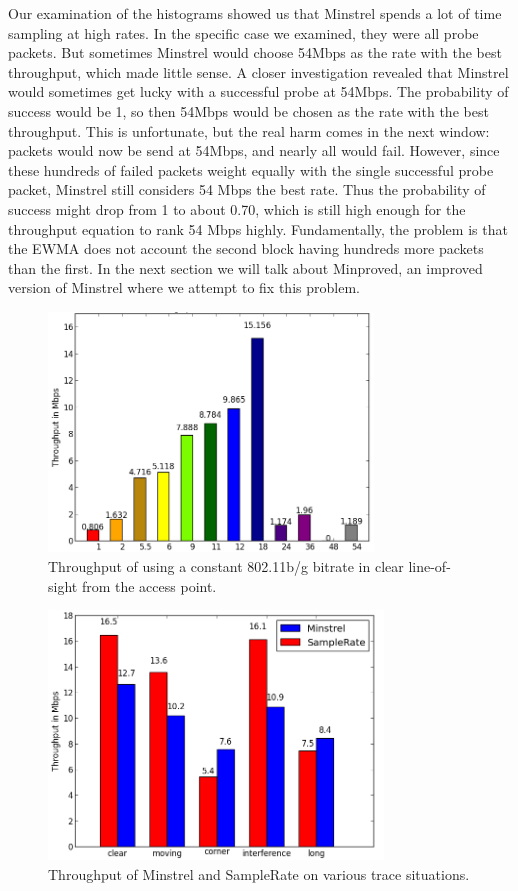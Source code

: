 \documentclass[letterpaper,twocolumn,10pt]{article}
\begin{document}
Our examination of the histograms showed us that Minstrel spends a lot of time sampling at high rates. In the specific case we examined, they were all probe packets. But sometimes Minstrel would choose 54Mbps as the rate with the best throughput, which made little sense. A closer investigation revealed that Minstrel would sometimes get lucky with a successful probe at 54Mbps. The probability of success would be 1, so then 54Mbps would be chosen as the rate with the best throughput. This is unfortunate, but the real harm comes in the next window: packets would now be send at 54Mbps, and nearly all would fail.  However, since these hundreds of failed packets weight equally with the single successful probe packet, Minstrel still considers 54 Mbps the best rate. Thus the probability of success might drop from 1 to about 0.70, which is still high enough for the throughput equation to rank 54 Mbps highly. Fundamentally, the problem is that the EWMA does not account the second block having hundreds more packets than the first.  In the next section we will talk about Minproved, an improved version of Minstrel where we attempt to fix this problem. 

\begin{figure}[htb]
  \hspace{-1em}\includegraphics[width=3.4in]{constant.png}\vspace{-0em}
  \caption{Throughput of using a constant 802.11b/g bitrate in clear line-of-sight from the access point.}
\label{figure:2}
\end{figure}


\begin{figure}[htb]
  \hspace{-.75em}\includegraphics[width=3.5in]{MinVSSam1.png}\vspace{-0.75em}
  \caption{Throughput of Minstrel and SampleRate on various trace situations.}
\label{figure:3}
\end{figure}
\end{document}
